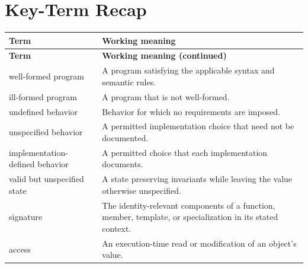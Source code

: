 \documentclass[11pt,letterpaper]{article}
\begin{document}
\section{Key-Term Recap}
\begin{longtable}{@{}>{\RaggedRight\arraybackslash}p{}>{\RaggedRight\arraybackslash}p{}@{}}\toprule\textbf{Term} & \textbf{Working meaning}\\\midrule\endfirsthead\toprule\textbf{Term} & \textbf{Working meaning (continued)}\\\midrule\endhead\bottomrule\endfoot
well-formed program & A program satisfying the applicable syntax and semantic rules.\\
ill-formed program & A program that is not well-formed.\\
undefined behavior & Behavior for which no requirements are imposed.\\
unspecified behavior & A permitted implementation choice that need not be documented.\\
implementation-defined behavior & A permitted choice that each implementation documents.\\
valid but unspecified state & A state preserving invariants while leaving the value otherwise unspecified.\\
signature & The identity-relevant components of a function, member, template, or specialization in its stated context.\\
access & An execution-time read or modification of an object's value.\\
\end{longtable}
\end{document}
